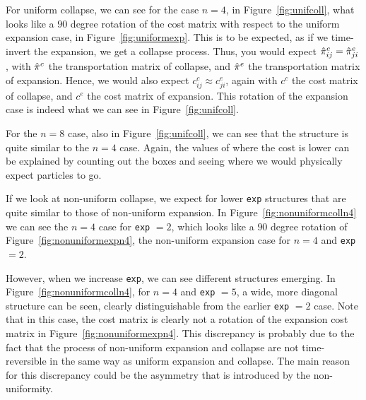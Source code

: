 For uniform collapse, we can see for the case $n=4$, in Figure~\ref{fig:unifcoll}, what looks like a $90$ degree rotation of the cost matrix with respect to the uniform expansion case, in Figure~\ref{fig:uniformexp}. This is to be expected, as if we time-invert the expansion, we get a collapse process. Thus, you would expect $\hat{\pi}^c_{ij} = \hat{\pi}^e_{ji}$, with $\hat{\pi}^c$ the transportation matrix of collapse, and $\hat{\pi}^e$ the transportation matrix of expansion. Hence, we would also expect $c^c_{ij} \approx c^e_{ji}$, again with $c^c$ the cost matrix of collapse, and $c^e$ the cost matrix of expansion. This rotation of the expansion case is indeed what we can see in Figure~\ref{fig:unifcoll}. \par 
For the $n=8$ case, also in Figure~\ref{fig:unifcoll}, we can see that the structure is quite similar to the $n=4$ case. Again, the values of where the cost is lower can be explained by counting out the boxes and seeing where we would physically expect particles to go. \par 
If we look at non-uniform collapse, we expect for lower \lstinline|exp| structures that are quite similar to those of non-uniform expansion. In Figure~\ref{fig:nonuniformcolln4} we can see the $n=4$ case for \lstinline|exp| $=2$, which looks like a $90$ degree rotation of Figure~\ref{fig:nonuniformexpn4}, the non-uniform expansion case for $n=4$ and \lstinline|exp| $=2$.  \par 
However, when we increase \lstinline|exp|, we can see different structures emerging. In Figure~\ref{fig:nonuniformcolln4}, for $n=4$ and \lstinline|exp| $=5$, a wide, more diagonal structure can be seen, clearly distinguishable from the earlier \lstinline|exp| $=2$ case. Note that in this case, the cost matrix is clearly not a rotation of the expansion cost matrix in Figure~\ref{fig:nonuniformexpn4}. This discrepancy is probably due to the fact that the process of non-uniform expansion and collapse are not time-reversible in the same way as uniform expansion and collapse. The main reason for this discrepancy could be the asymmetry that is introduced by the non-uniformity. 


